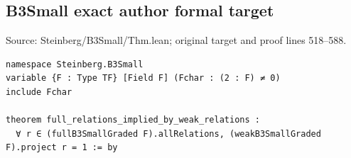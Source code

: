 \subsection*{B3Small exact author formal target}
\noindent Source: Steinberg/B3Small/Thm.lean; original target and proof lines 518--588.
\begin{Verbatim}
namespace Steinberg.B3Small
variable {F : Type TF} [Field F] (Fchar : (2 : F) ≠ 0)
include Fchar

theorem full_relations_implied_by_weak_relations :
  ∀ r ∈ (fullB3SmallGraded F).allRelations, (weakB3SmallGraded F).project r = 1 := by
\end{Verbatim}
